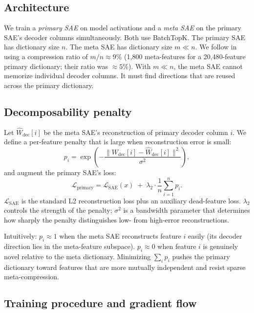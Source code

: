 \documentclass{article} %
\begin{document}
\subsection{Architecture}

We train a \emph{primary SAE} on model activations and a \emph{meta SAE} on the
primary SAE's decoder columns simultaneously.
Both use BatchTopK.
The primary SAE has dictionary size $n$. The meta SAE has dictionary size
$m \ll n$. We follow \citet{bussmann2024metasaes} in using a compression
ratio of $m/n \approx 9\%$ (1,800 meta-features for a 20,480-feature primary
dictionary; their ratio was $\approx 5\%$).
With $m \ll n$, the meta SAE cannot memorize individual decoder columns. It must
find directions that are reused across the primary dictionary.

\subsection{Decomposability penalty}

Let $\hat{W}_\text{dec}[i]$ be the meta SAE's reconstruction of primary decoder
column $i$.
We define a per-feature penalty that is large when reconstruction error is small:
\begin{equation}
  p_i = \exp\!\left(-\frac{\|W_\text{dec}[i] - \hat{W}_\text{dec}[i]\|^2}{\sigma^2}\right),
  \label{eq:penalty}
\end{equation}
and augment the primary SAE's loss:
\begin{equation}
  \mathcal{L}_\text{primary} = \mathcal{L}_\text{SAE}(x) \;+\;
    \lambda_2\cdot\frac{1}{n}\sum_{i=1}^{n} p_i.
  \label{eq:loss}
\end{equation}
$\mathcal{L}_\text{SAE}$ is the standard L2 reconstruction loss plus an auxiliary
dead-feature loss.
$\lambda_2$ controls the strength of the penalty; $\sigma^2$ is a bandwidth
parameter that determines how sharply the penalty distinguishes low- from
high-error reconstructions.

Intuitively: $p_i \approx 1$ when the meta SAE reconstructs feature $i$ easily
(its decoder direction lies in the meta-feature subspace). $p_i \approx 0$ when
feature $i$ is genuinely novel relative to the meta dictionary.
Minimizing $\sum_i p_i$ pushes the primary dictionary toward features that
are more mutually independent and resist sparse meta-compression.

\subsection{Training procedure and gradient flow}
\end{document}
